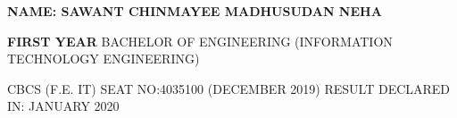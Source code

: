 \documentclass{article} %
\begin{document}
\noindent 

\noindent 

\noindent 

\noindent 

\noindent 

\noindent 

\noindent 

\noindent 

\noindent 

\noindent 

\noindent 

\noindent 

\noindent 

\noindent 

\noindent 

\noindent 

\noindent 

\noindent 

\noindent 

\noindent \eject                                                                                                                                                                              

\noindent 

\noindent 

\noindent \textbf{}

\noindent 

\noindent \textbf{NAME: SAWANT CHINMAYEE MADHUSUDAN NEHA}

\noindent 

\noindent \textbf{FIRST YEAR} BACHELOR OF ENGINEERING (INFORMATION TECHNOLOGY ENGINEERING)

\noindent 

\noindent \textbf{}  CBCS (F.E. IT)             SEAT NO:4035100 (DECEMBER 2019)     RESULT DECLARED IN: JANUARY 2020

\noindent 

\noindent 
\end{document}
